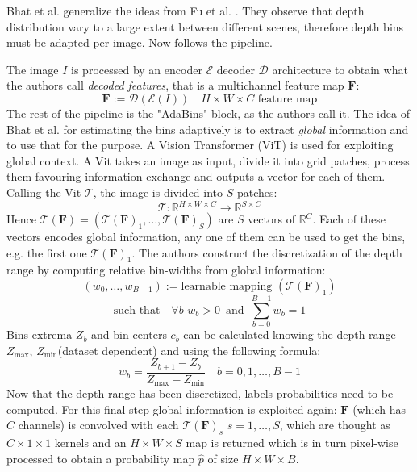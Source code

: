 Bhat et al. \cite{AdaBins} generalize the ideas from Fu et al. \cite{ordinal_regression}.
They observe that depth distribution vary to a large extent between different scenes, therefore depth bins must be adapted per image.
Now follows the pipeline.

The image $I$ is processed by an encoder $\mathcal{E}$ decoder $\mathcal{D}$ architecture to obtain what the authors call \textit{decoded features}, that is a multichannel feature map $\mathbf{F}$:
\[
	\mathbf{F} := \mathcal{D}(\mathcal{E}(I)) \quad H \times W \times C \text{ feature map}
\]
The rest of the pipeline is the "AdaBins" block, as the authors call it.
The idea of Bhat et al. for estimating the bins adaptively is to extract \textit{global} information and to use that for the purpose.
A Vision Transformer (ViT) \cite{ViT} is used for exploiting global context.
A Vit takes an image as input, divide it into grid patches, process them favouring information exchange and outputs a vector for each of them. Calling the Vit $\mathcal{T}$, the image is divided into $S$ patches:
\[
	\mathcal{T}: \mathbb{R}^{H \times W \times C} \rightarrow \mathbb{R}^{S \times C}
\]
Hence $\mathcal{T}(\mathbf{F}) = (\mathcal{T}(\mathbf{F})_{1}, \dotsc, \mathcal{T}(\mathbf{F})_{S})$ are $S$ vectors of $\mathbb{R}^{C}$.
Each of these vectors encodes global information, any one of them can be used to get the bins, e.g. the first one $\mathcal{T}(\mathbf{F})_{1}$.
The authors construct the discretization of the depth range by computing relative bin-widths from global information:
\[
	(w_{0}, \dotsc, w_{B-1}) := \text{learnable mapping }(\mathcal{T}(\mathbf{F})_{1})
\]\[
	\text{such that} \quad \forall b \,\, w_{b} > 0 \, \text{ and } \, \sum_{b=0}^{B-1} w_{b} = 1
\]
Bins extrema $Z_{b}$ and bin centers $c_{b}$ can be calculated knowing the depth range $Z_{\text{max}}$, $Z_{\text{min}}$(dataset dependent) and using the following formula:
\[
	w_{b} = \frac{Z_{b+1} - Z_{b}}{Z_{\text{max}} - Z_{\text{min}}} \quad b=0, 1, \dotsc, B-1
\]
Now that the depth range has been discretized, labels probabilities need to be computed.
For this final step global information is exploited again: $\mathbf{F}$ (which has $C$ channels) is convolved with each $\mathcal{T}(\mathbf{F})_{s}$ $s=1,\dotsc,S$, which are thought as $C \times 1 \times 1$ kernels and an $H \times W \times S$ map is returned which is in turn pixel-wise processed to obtain a probability map $\hat{p}$ of size $H \times W \times B$.

